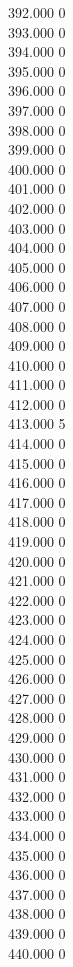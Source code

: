 { 392.000	0 \\
 393.000	0 \\
 394.000	0 \\
 395.000	0 \\
 396.000	0 \\
 397.000	0 \\
 398.000	0 \\
 399.000	0 \\
 400.000	0 \\
 401.000	0 \\
 402.000	0 \\
 403.000	0 \\
 404.000	0 \\
 405.000	0 \\
 406.000	0 \\
 407.000	0 \\
 408.000	0 \\
 409.000	0 \\
 410.000	0 \\
 411.000	0 \\
 412.000	0 \\
 413.000	5 \\
 414.000	0 \\
 415.000	0 \\
 416.000	0 \\
 417.000	0 \\
 418.000	0 \\
 419.000	0 \\
 420.000	0 \\
 421.000	0 \\
 422.000	0 \\
 423.000	0 \\
 424.000	0 \\
 425.000	0 \\
 426.000	0 \\
 427.000	0 \\
 428.000	0 \\
 429.000	0 \\
 430.000	0 \\
 431.000	0 \\
 432.000	0 \\
 433.000	0 \\
 434.000	0 \\
 435.000	0 \\
 436.000	0 \\
 437.000	0 \\
 438.000	0 \\
 439.000	0 \\
 440.000	0 \\
}
